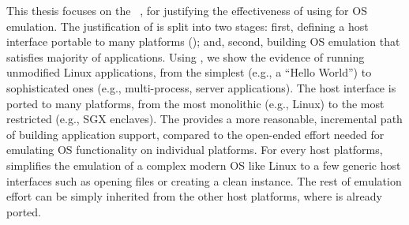 This thesis focuses on the \term{\graphene{} \libos{}}~\citep{tsai14graphene}, for justifying the effectiveness of using \liboses{} for OS emulation.
The justification of \graphene{} is split into two stages:
first, defining a host interface portable to many platforms ();
and, second, building OS emulation that satisfies majority of applications.
Using \graphene{}, we show the evidence of running unmodified Linux applications, from the simplest (e.g., a ``Hello World'') to sophisticated ones (e.g., multi-process, server applications).
The host interface is ported to many platforms, from the most monolithic (e.g., Linux)
to the most restricted (e.g., SGX enclaves).
The \graphene{} \libos{} provides a more reasonable, incremental path of building application support,
compared to the open-ended effort needed for emulating OS functionality on individual platforms.
For every host platforms,
\graphene{} simplifies the emulation of a complex modern OS like Linux
to a few generic host interfaces
such as opening files or creating a clean instance.
The rest of emulation effort can be simply inherited from the other host platforms,
where \graphene{} is already ported.



